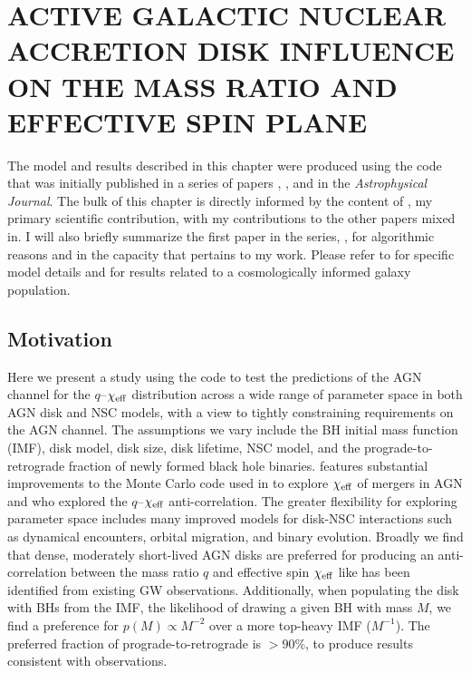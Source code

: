\section{\texorpdfstring{\MakeUppercase{active galactic nuclear accretion disk influence on the mass ratio and effective spin plane}}{active galactic nuclear accretion disk influence on the mass ratio and effective spin plane}}
\label{sec:qXeff}


\par The model and results described in this chapter were produced using the \mcfacts code that was initially published in a series of papers \mcfacts {}
\citep{McKernan+25-mcfactsI}, \mcfacts {} \citep{Cook+25}, and \mcfacts {} \citep{Delfavero+25-mcfactsIII} in the \textit{Astrophysical Journal}.
The bulk of this chapter is directly informed by the content of \citet{Cook+25}, my primary scientific contribution, with my contributions to the other papers mixed in.
I will also briefly summarize the first paper in the series, \citet{McKernan+25-mcfactsI}, for algorithmic reasons and in the capacity that pertains to my work.
Please refer to \citet{McKernan+25-mcfactsI} for specific model details and \citet{Delfavero+25-mcfactsIII} for results related to a cosmologically informed galaxy population.

\subsection{Motivation}

Here we present a study using the \mcfacts code \citep{McKernan+25-mcfactsI, Cook+25, Delfavero+25-mcfactsIII} to test the predictions of the AGN channel for the $q$--$\chi_{\rm eff}$ distribution across a wide range of parameter space in both AGN disk and NSC models, with a view to tightly constraining requirements on the AGN channel.
The assumptions we vary include the BH initial mass function (IMF), disk model, disk size, disk lifetime, NSC model, and the prograde-to-retrograde fraction of newly formed black hole binaries.
\mcfacts features substantial improvements to the Monte Carlo code used in \citet{McKernan+20a} to explore $\chi_{\rm eff}$ of mergers in AGN and \citet{McKernan+22:q-Xeff} who explored the $q$--$\chi_{\rm eff}$ anti-correlation.
The greater flexibility for exploring parameter space includes many improved models for disk-NSC interactions such as dynamical encounters, orbital migration, and binary evolution.
Broadly we find that dense, moderately short-lived AGN disks are preferred for producing an anti-correlation between the mass ratio $q$ and effective spin $\chi_{\rm eff}$ like has been identified from existing GW observations.
Additionally, when populating the disk with BHs from the IMF, the likelihood of drawing a given BH with mass $M$, we find a preference for $p(M) \propto M^{-2}$ over a more top-heavy IMF ($M^{-1}$).
The preferred fraction of prograde-to-retrograde is $>90\%$, to produce results consistent with observations.



